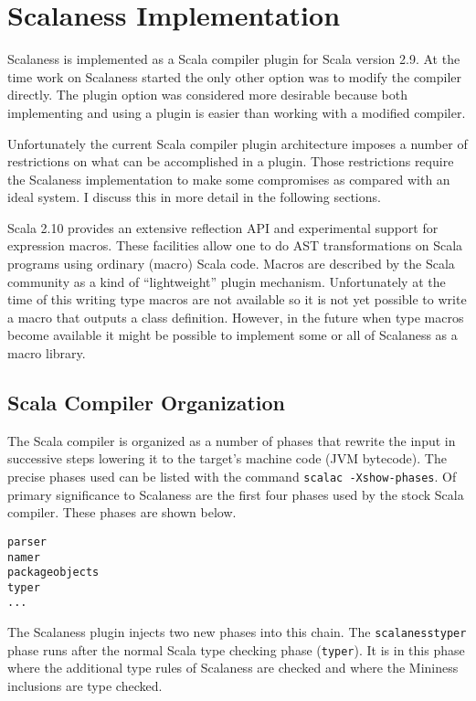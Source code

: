 \chapter{Scalaness Implementation}
\label{chap:scalaness-implementation}

Scalaness is implemented as a Scala compiler plugin for Scala version 2.9. At the time work on
Scalaness started the only other option was to modify the compiler directly. The plugin option
was considered more desirable because both implementing and using a plugin is easier than
working with a modified compiler.

Unfortunately the current Scala compiler plugin architecture imposes a number of restrictions on
what can be accomplished in a plugin. Those restrictions require the Scalaness implementation to
make some compromises as compared with an ideal system. I discuss this in more detail in the
following sections.

Scala 2.10 provides an extensive reflection API and experimental support for expression macros.
These facilities allow one to do AST transformations on Scala programs using ordinary (macro)
Scala code. Macros are described by the Scala community as a kind of ``lightweight'' plugin
mechanism. Unfortunately at the time of this writing type macros are not available so it is not
yet possible to write a macro that outputs a class definition. However, in the future when type
macros become available it might be possible to implement some or all of Scalaness as a macro
library.

\section{Scala Compiler Organization}

The Scala compiler is organized as a number of phases that rewrite the input in successive steps
lowering it to the target's machine code (JVM bytecode). The precise phases used can be listed
with the command \texttt{scalac -Xshow-phases}. Of primary significance to Scalaness are the
first four phases used by the stock Scala compiler. These phases are shown below.

\singlespace
\begin{Verbatim}
parser
namer
packageobjects
typer
...
\end{Verbatim}
\primaryspacing

The Scalaness plugin injects two new phases into this chain. The \texttt{scalanesstyper} phase
runs after the normal Scala type checking phase (\texttt{typer}). It is in this phase where the
additional type rules of Scalaness are checked and where the Mininess inclusions are type
checked.

